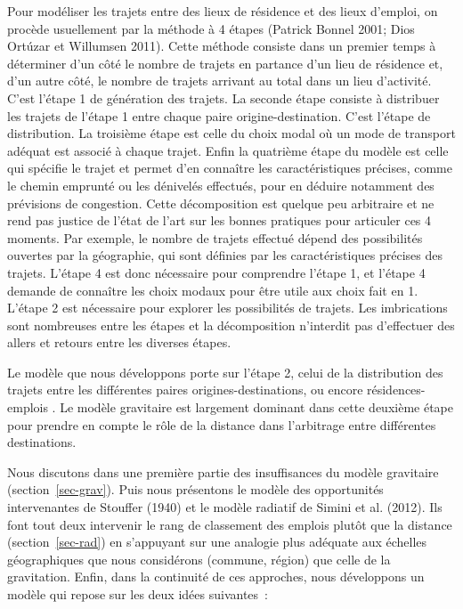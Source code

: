 \documentclass[
  10pt,
  a4paper,
  numbers=noendperiod,
  DIV=9]{scrartcl}
\begin{document}
Pour modéliser les trajets entre des lieux de résidence et des lieux
d'emploi, on procède usuellement par la méthode à 4 étapes (Patrick
Bonnel 2001; Dios Ortúzar et Willumsen 2011). Cette méthode consiste
dans un premier temps à déterminer d'un côté le nombre de trajets en
partance d'un lieu de résidence et, d'un autre côté, le nombre de
trajets arrivant au total dans un lieu d'activité. C'est l'étape 1 de
génération des trajets. La seconde étape consiste à distribuer les
trajets de l'étape 1 entre chaque paire origine-destination. C'est
l'étape de distribution. La troisième étape est celle du choix modal où
un mode de transport adéquat est associé à chaque trajet. Enfin la
quatrième étape du modèle est celle qui spécifie le trajet et permet
d'en connaître les caractéristiques précises, comme le chemin emprunté
ou les dénivelés effectués, pour en déduire notamment des prévisions de
congestion. Cette décomposition est quelque peu arbitraire et ne rend
pas justice de l'état de l'art sur les bonnes pratiques pour articuler
ces 4 moments. Par exemple, le nombre de trajets effectué dépend des
possibilités ouvertes par la géographie, qui sont définies par les
caractéristiques précises des trajets. L'étape 4 est donc nécessaire
pour comprendre l'étape 1, et l'étape 4 demande de connaître les choix
modaux pour être utile aux choix fait en 1. L'étape 2 est nécessaire
pour explorer les possibilités de trajets. Les imbrications sont
nombreuses entre les étapes et la décomposition n'interdit pas
d'effectuer des allers et retours entre les diverses étapes.

Le modèle que nous développons porte sur l'étape 2, celui de la
distribution des trajets entre les différentes paires
origines-destinations, ou encore résidences-emplois . Le modèle
gravitaire est largement dominant dans cette deuxième étape pour prendre
en compte le rôle de la distance dans l'arbitrage entre différentes
destinations.

Nous discutons dans une première partie des insuffisances du modèle
gravitaire (section~\ref{sec-grav}). Puis nous présentons le modèle des
opportunités intervenantes de Stouffer (1940) et le modèle radiatif de
Simini et al. (2012). Ils font tout deux intervenir le rang de
classement des emplois plutôt que la distance (section~\ref{sec-rad}) en
s'appuyant sur une analogie plus adéquate aux échelles géographiques que
nous considérons (commune, région) que celle de la gravitation. Enfin,
dans la continuité de ces approches, nous développons un modèle qui
repose sur les deux idées suivantes~:
\end{document}
